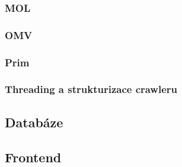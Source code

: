 
\subsubsection{MOL}


\subsubsection{OMV}


\subsubsection{Prim}


\subsubsection{Threading a strukturizace crawleru}


\subsection{Databáze}


\subsection{Frontend}


\endinput
